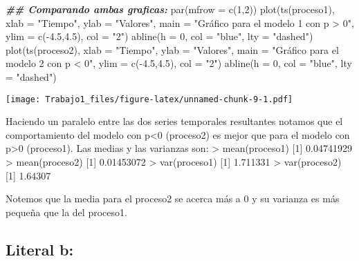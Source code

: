 \documentclass[
]{article}
\newenvironment{Shaded}{\begin{snugshade}}{\end{snugshade}}
\newcommand{\AttributeTok}[1]{\textcolor[rgb]{0.77,0.63,0.00}{#1}}
\newcommand{\DecValTok}[1]{\textcolor[rgb]{0.00,0.00,0.81}{#1}}
\newcommand{\DocumentationTok}[1]{\textcolor[rgb]{0.56,0.35,0.01}{\textbf{\textit{#1}}}}
\newcommand{\FloatTok}[1]{\textcolor[rgb]{0.00,0.00,0.81}{#1}}
\newcommand{\FunctionTok}[1]{\textcolor[rgb]{0.00,0.00,0.00}{#1}}
\newcommand{\NormalTok}[1]{#1}
\newcommand{\SpecialCharTok}[1]{\textcolor[rgb]{0.00,0.00,0.00}{#1}}
\newcommand{\StringTok}[1]{\textcolor[rgb]{0.31,0.60,0.02}{#1}}
\begin{document}
\begin{Shaded}
\begin{Highlighting}[]
\DocumentationTok{\#\# Comparando ambas graficas: }
\FunctionTok{par}\NormalTok{(}\AttributeTok{mfrow =} \FunctionTok{c}\NormalTok{(}\DecValTok{1}\NormalTok{,}\DecValTok{2}\NormalTok{))}
\FunctionTok{plot}\NormalTok{(}\FunctionTok{ts}\NormalTok{(proceso1), }\AttributeTok{xlab =} \StringTok{"Tiempo"}\NormalTok{, }\AttributeTok{ylab =} \StringTok{"Valores"}\NormalTok{,}
                 \AttributeTok{main =} \StringTok{"Gráfico para el modelo 1 con p \textgreater{} 0"}\NormalTok{, }
                 \AttributeTok{ylim =} \FunctionTok{c}\NormalTok{(}\SpecialCharTok{{-}}\FloatTok{4.5}\NormalTok{,}\FloatTok{4.5}\NormalTok{), }\AttributeTok{col =} \StringTok{"2"}\NormalTok{)}
\FunctionTok{abline}\NormalTok{(}\AttributeTok{h =} \DecValTok{0}\NormalTok{, }\AttributeTok{col =} \StringTok{"blue"}\NormalTok{, }\AttributeTok{lty =} \StringTok{"dashed"}\NormalTok{)}
\FunctionTok{plot}\NormalTok{(}\FunctionTok{ts}\NormalTok{(proceso2), }\AttributeTok{xlab =} \StringTok{"Tiempo"}\NormalTok{, }\AttributeTok{ylab =} \StringTok{"Valores"}\NormalTok{,}
                 \AttributeTok{main =} \StringTok{"Gráfico para el modelo 2 con p \textless{} 0"}\NormalTok{,}
                 \AttributeTok{ylim =} \FunctionTok{c}\NormalTok{(}\SpecialCharTok{{-}}\FloatTok{4.5}\NormalTok{,}\FloatTok{4.5}\NormalTok{), }\AttributeTok{col =} \StringTok{"2"}\NormalTok{)}
\FunctionTok{abline}\NormalTok{(}\AttributeTok{h =} \DecValTok{0}\NormalTok{, }\AttributeTok{col =} \StringTok{"blue"}\NormalTok{, }\AttributeTok{lty =} \StringTok{"dashed"}\NormalTok{)}
\end{Highlighting}
\end{Shaded}

\texttt{[image: Trabajo1\_files/figure-latex/unnamed-chunk-9-1.pdf]}

Haciendo un paralelo entre las dos series temporales resultantes notamos
que el comportamiento del modelo con p\textless0 (proceso2) es mejor que
para el modelo con p\textgreater0 (proceso1). Las medias y las varianzas
son: \textgreater{} mean(proceso1) {[}1{]} 0.04741929 \textgreater{}
mean(proceso2) {[}1{]} 0.01453072 \textgreater{} var(proceso1) {[}1{]}
1.711331 \textgreater{} var(proceso2) {[}1{]} 1.64307

Notemos que la media para el proceso2 se acerca más a 0 y su varianza es
más pequeña que la del proceso1.

\hypertarget{literal-b-1}{%
\subsection{Literal b:}\label{literal-b-1}}
\end{document}
